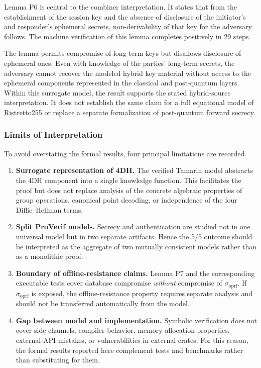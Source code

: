 \documentclass[preprint,12pt]{elsarticle}
\newcommand{\sigoprf}{\sigma_{\mathrm{oprf}}}
\theoremstyle{remark}
\begin{document}
Lemma P6 is central to the combiner interpretation. It states that from
the establishment of the session key and the absence of disclosure of
the initiator's and responder's ephemeral secrets, non-derivability of
that key for the adversary follows. The machine verification of this
lemma completes positively in 29 steps.

The lemma permits compromise of long-term keys but disallows disclosure
of ephemeral ones. Even with knowledge of the parties' long-term
secrets, the adversary cannot recover the modeled hybrid key material
without access to the ephemeral components represented in the classical
and post-quantum layers. Within this surrogate model, the result
supports the stated hybrid-source interpretation. It does not establish
the same claim for a full equational model of Ristretto255 or replace a
separate formalization of post-quantum forward secrecy.

\subsubsection{Limits of Interpretation}

To avoid overstating the formal results, four principal limitations are
recorded.
\begin{enumerate}
  \item \textbf{Surrogate representation of 4DH.} The verified Tamarin
        model abstracts the 4DH component into a single knowledge
        function. This facilitates the proof but does not replace
        analysis of the concrete algebraic properties of group
        operations, canonical point decoding, or independence of the
        four Diffie--Hellman terms.
  \item \textbf{Split ProVerif models.} Secrecy and authentication are
        studied not in one universal model but in two separate
        artifacts. Hence the 5/5 outcome should be interpreted as the
        aggregate of two mutually consistent models rather than as a
        monolithic proof.
  \item \textbf{Boundary of offline-resistance claims.} Lemma P7 and the
        corresponding executable tests cover database compromise \emph{without}
        compromise of $\sigoprf$. If $\sigoprf$ is exposed, the
        offline-resistance property requires separate analysis and
        should not be transferred automatically from the model.
  \item \textbf{Gap between model and implementation.} Symbolic
        verification does not cover side channels, compiler behavior,
        memory-allocation properties, external-API mistakes, or
        vulnerabilities in external crates. For this reason, the formal
        results reported here complement tests and benchmarks rather than
        substituting for them.
\end{enumerate}
\end{document}
